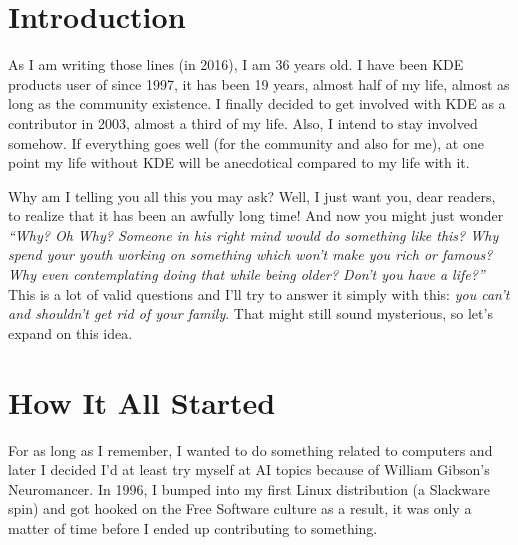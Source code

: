 

\section*{Introduction}
As I am writing those lines (in 2016), I am 36 years old. I have been KDE
products user of since 1997, it has been 19 years, almost half of my life, almost
as long as the community existence. I finally decided to get involved with KDE
as a contributor in 2003, almost a third of my life. Also, I intend to stay
involved somehow. If everything goes well (for the community and also for me),
at one point my life without KDE will be anecdotical compared to my life with
it.

Why am I telling you all this you may ask? Well, I just want you, dear readers,
to realize that it has been an awfully long time! And now you might just wonder
\emph{``Why? Oh Why? Someone in his right mind would do something like this?
Why spend your youth working on something which won't make you rich or famous?
Why even contemplating doing that while being older? Don't you have a life?''} \\

This is a lot of valid questions and I'll try to answer it simply with this:
\emph{you can't and shouldn't get rid of your family}. That might still sound
mysterious, so let's expand on this idea.

\section*{How It All Started}
For as long as I remember, I wanted to do something related to computers and
later I decided I'd at least try myself at AI topics because of William Gibson's
Neuromancer. In 1996, I bumped into my first Linux distribution (a Slackware
spin) and got hooked on the Free Software culture as a result, it was only a
matter of time before I ended up contributing to something. \\

